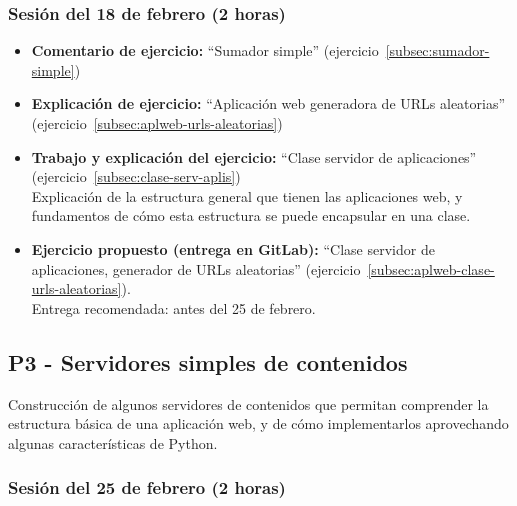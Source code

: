 \documentclass[a4paper,12pt]{article}
\begin{document}
\subsubsection{Sesión del 18 de febrero (2 horas)}

\begin{itemize}
\item \textbf{Comentario de ejercicio:} ``Sumador simple'' (ejercicio~\ref{subsec:sumador-simple}) 
\item \textbf{Explicación de ejercicio:} ``Aplicación web generadora de URLs aleatorias'' (ejercicio~\ref{subsec:aplweb-urls-aleatorias})
\item \textbf{Trabajo y explicación del ejercicio:} ``Clase servidor de aplicaciones'' (ejercicio~\ref{subsec:clase-serv-aplis}) \\
  Explicación de la estructura general que tienen las aplicaciones web, y fundamentos de cómo esta estructura se puede encapsular en una clase.
\item \textbf{Ejercicio propuesto (entrega en GitLab):} ``Clase servidor de aplicaciones, generador de URLs aleatorias'' (ejercicio~\ref{subsec:aplweb-clase-urls-aleatorias}). \\
  Entrega recomendada: antes del 25 de febrero.
\end{itemize}


\subsection{P3 - Servidores simples de contenidos}

Construcción de algunos servidores de contenidos que permitan comprender la estructura básica de una aplicación web, y de cómo implementarlos aprovechando algunas características de Python.

\subsubsection{Sesión del 25 de febrero (2 horas)}
\end{document}
